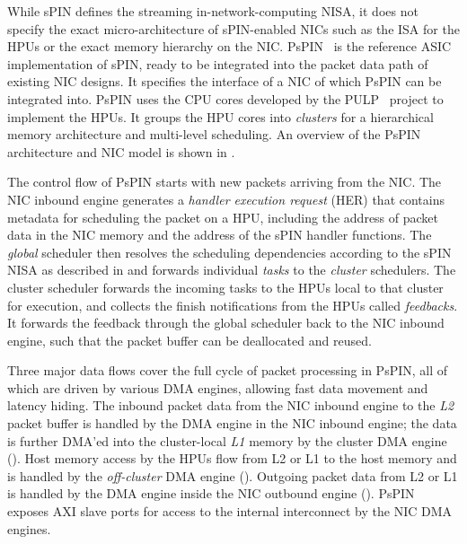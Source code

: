 While sPIN defines the streaming in-network-computing NISA, it does not specify the exact micro-architecture of sPIN-enabled NICs such as the ISA for the HPUs or the exact memory hierarchy on the NIC.  PsPIN~\cite{di_girolamo_pspin_2021} is the reference ASIC implementation of sPIN, ready to be integrated into the packet data path of existing NIC designs.  It specifies the interface of a NIC of which PsPIN can be integrated into.  PsPIN uses the CPU cores developed by the PULP~\cite{rossi_pulp_2015} project to implement the HPUs.  It groups the HPU cores into \emph{clusters} for a hierarchical memory architecture and multi-level scheduling.  An overview of the PsPIN architecture and NIC model is shown in .

The control flow of PsPIN starts with new packets arriving from the NIC.  The NIC inbound engine generates a \emph{handler execution request} (HER) that contains metadata for scheduling the packet on a HPU, including the address of packet data in the NIC memory and the address of the sPIN handler functions.  The \emph{global} scheduler then resolves the scheduling dependencies according to the sPIN NISA as described in  and forwards individual \emph{tasks} to the \emph{cluster} schedulers.  The cluster scheduler forwards the incoming tasks to the HPUs local to that cluster for execution, and collects the finish notifications from the HPUs called \emph{feedbacks}.  It forwards the feedback through the global scheduler back to the NIC inbound engine, such that the packet buffer can be deallocated and reused.

Three major data flows cover the full cycle of packet processing in PsPIN, all of which are driven by various DMA engines, allowing fast data movement and latency hiding.  The inbound packet data from the NIC inbound engine to the \emph{L2} packet buffer is handled by the DMA engine in the NIC inbound engine; the data is further DMA'ed into the cluster-local \emph{L1} memory by the cluster DMA engine ().  Host memory access by the HPUs flow from L2 or L1 to the host memory and is handled by the \emph{off-cluster} DMA engine ().  Outgoing packet data from L2 or L1 is handled by the DMA engine inside the NIC outbound engine ().  PsPIN exposes AXI slave ports for access to the internal interconnect by the NIC DMA engines.

